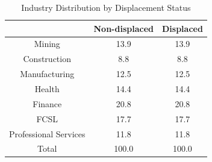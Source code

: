 \documentclass{article}
\begin{document}
\begin{table}[htbp] 
\centering 
\begin{threeparttable} 
\caption{Industry Distribution by Displacement Status} 

\centering
\begin{tabular}{lll}
\toprule
\multicolumn{1}{c}{} &
  \multicolumn{1}{c}{Non-displaced} &
  \multicolumn{1}{c}{Displaced} \\
\midrule
\multicolumn{1}{c}{Mining} &
  \multicolumn{1}{c}{13.9} &
  \multicolumn{1}{c}{13.9} \\
\multicolumn{1}{c}{Construction} &
  \multicolumn{1}{c}{8.8} &
  \multicolumn{1}{c}{8.8} \\
\multicolumn{1}{c}{Manufacturing} &
  \multicolumn{1}{c}{12.5} &
  \multicolumn{1}{c}{12.5} \\
\multicolumn{1}{c}{Health} &
  \multicolumn{1}{c}{14.4} &
  \multicolumn{1}{c}{14.4} \\
\multicolumn{1}{c}{Finance} &
  \multicolumn{1}{c}{20.8} &
  \multicolumn{1}{c}{20.8} \\
\multicolumn{1}{c}{FCSL} &
  \multicolumn{1}{c}{17.7} &
  \multicolumn{1}{c}{17.7} \\
\multicolumn{1}{c}{Professional Services} &
  \multicolumn{1}{c}{11.8} &
  \multicolumn{1}{c}{11.8} \\
\multicolumn{1}{c}{Total} &
  \multicolumn{1}{c}{100.0} &
  \multicolumn{1}{c}{100.0} \\
\bottomrule
\end{tabular}

\end{threeparttable} 
\end{table}
\end{document}
